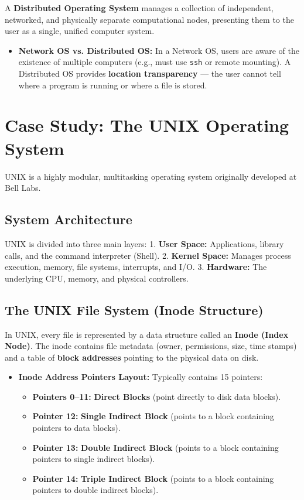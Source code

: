 \documentclass[12pt,a4paper]{article}
\begin{document}
A \textbf{Distributed Operating System} manages a collection of independent, networked, and physically separate computational nodes, presenting them to the user as a single, unified computer system.
\begin{itemize}[leftmargin=*, itemsep=3pt]
  \item \textbf{Network OS vs. Distributed OS:} In a Network OS, users are aware of the existence of multiple computers (e.g., must use \texttt{ssh} or remote mounting). A Distributed OS provides \textbf{location transparency} --- the user cannot tell where a program is running or where a file is stored.
\end{itemize}

\section{Case Study: The UNIX Operating System}

UNIX is a highly modular, multitasking operating system originally developed at Bell Labs.

\subsection{System Architecture}
UNIX is divided into three main layers:
1. \textbf{User Space:} Applications, library calls, and the command interpreter (Shell).
2. \textbf{Kernel Space:} Manages process execution, memory, file systems, interrupts, and I/O.
3. \textbf{Hardware:} The underlying CPU, memory, and physical controllers.

\subsection{The UNIX File System (Inode Structure)}
In UNIX, every file is represented by a data structure called an \textbf{Inode (Index Node)}. The inode contains file metadata (owner, permissions, size, time stamps) and a table of \textbf{block addresses} pointing to the physical data on disk.

\begin{itemize}[leftmargin=*, itemsep=3pt]
  \item \textbf{Inode Address Pointers Layout:} Typically contains 15 pointers:
  \begin{itemize}[leftmargin=*, itemsep=2.5pt, topsep=0pt]
    \item \textbf{Pointers 0–11:} \textbf{Direct Blocks} (point directly to disk data blocks).
    \item \textbf{Pointer 12:} \textbf{Single Indirect Block} (points to a block containing pointers to data blocks).
    \item \textbf{Pointer 13:} \textbf{Double Indirect Block} (points to a block containing pointers to single indirect blocks).
    \item \textbf{Pointer 14:} \textbf{Triple Indirect Block} (points to a block containing pointers to double indirect blocks).
    \end{itemize}
  \end{itemize}
\end{document}

